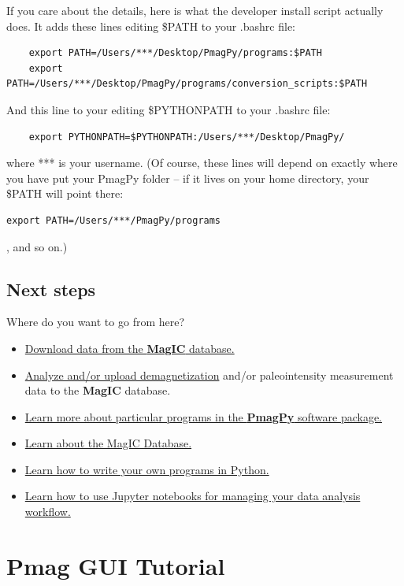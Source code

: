 \documentclass[11pt]{book}
\begin{document}
{
If you care about the details, here is what the developer install script actually does.  It adds these lines editing \$PATH to your .bashrc file:

\begin{verbatim}
    export PATH=/Users/***/Desktop/PmagPy/programs:$PATH
    export PATH=/Users/***/Desktop/PmagPy/programs/conversion_scripts:$PATH
\end{verbatim}

And this line to your editing \$PYTHONPATH to your .bashrc file:
\begin{verbatim}
    export PYTHONPATH=$PYTHONPATH:/Users/***/Desktop/PmagPy/
\end{verbatim}


where *** is your username.  (Of course, these lines will depend on exactly where you have put your PmagPy folder -- if it lives on your home directory, your \$PATH will point there: \begin{verbatim}export PATH=/Users/***/PmagPy/programs\end{verbatim}, and so on.)



\section{Next steps}

Where do you want to go from here?

\begin{itemize}
\item \href{#magic_download}{Download data from the {\bf MagIC} database.}
\item \href{#pmag_gui.py}{Analyze and/or upload demagnetization} and/or paleointensity measurement data to the {\bf MagIC} database.
\item \href{#PmagPy}{Learn more about particular programs in the {\bf PmagPy} software package.}
\item \href{#MagICDatabase}{Learn about the MagIC Database.}
\item \href{#Python}{Learn how to write your own programs in Python.}
\item \href{#Notebooks}{Learn how to use Jupyter notebooks for managing your data analysis workflow.}
\end{itemize}



\chapter{Pmag GUI Tutorial}
\label{chap:Pmag GUI}

}
\end{document}
